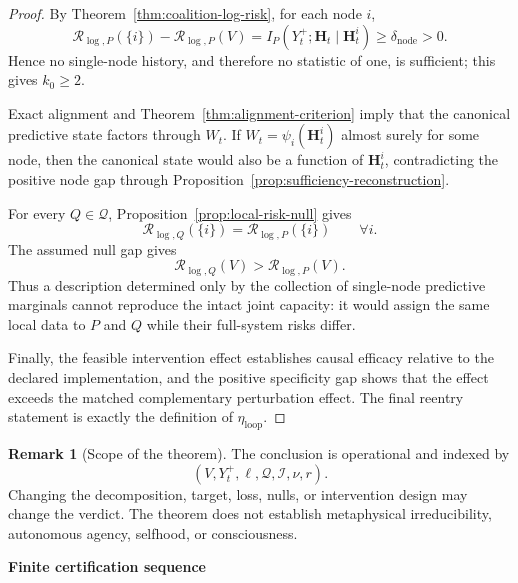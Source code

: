 \documentclass[11pt,letterpaper]{article}
\newcommand{\Risk}{\mathcal R}
\newcommand{\subtopic}[1]{%
 \vspace{0.45em}
 {\bfseries\color{AccentColor} #1\par}
}
\theoremstyle{plain}
\theoremstyle{definition}
\newtheorem{remark}[theorem]{Remark}
\begin{document}
\begin{proof}
By Theorem~\ref{thm:coalition-log-risk}, for each node \(i\),
\[
\Risk_{\log,P}(\{i\})-
\Risk_{\log,P}(V)
=
I_P(Y_t^+;\mathbf H_t\mid\mathbf H_t^i)
\geq
\delta_{\mathrm{node}}>0.
\]
Hence no single-node history, and therefore no statistic of one, is sufficient;
this gives \(k_0\geq2\).

Exact alignment and Theorem~\ref{thm:alignment-criterion} imply that the
canonical predictive state factors through \(W_t\). If
\(W_t=\psi_i(\mathbf H_t^i)\) almost surely for some node, then the canonical
state would also be a function of \(\mathbf H_t^i\), contradicting the positive
node gap through Proposition~\ref{prop:sufficiency-reconstruction}.

For every \(Q\in\mathcal Q\), Proposition~\ref{prop:local-risk-null} gives
\[
\Risk_{\log,Q}(\{i\})
=
\Risk_{\log,P}(\{i\})
\qquad\forall i.
\]
The assumed null gap gives
\[
\Risk_{\log,Q}(V)
>
\Risk_{\log,P}(V).
\]
Thus a description determined only by the collection of single-node predictive
marginals cannot reproduce the intact joint capacity: it would assign the same
local data to \(P\) and \(Q\) while their full-system risks differ.

Finally, the feasible intervention effect establishes causal efficacy relative
to the declared implementation, and the positive specificity gap shows that
the effect exceeds the matched complementary perturbation effect. The final
reentry statement is exactly the definition of \(\eta_{\mathrm{loop}}\).
\end{proof}

\begin{remark}[Scope of the theorem]
The conclusion is operational and indexed by
\[
(V,Y_t^+,\ell,\mathcal Q,\mathcal I,\nu,r).
\]
Changing the decomposition, target, loss, nulls, or intervention design may
change the verdict. The theorem does not establish metaphysical
irreducibility, autonomous agency, selfhood, or consciousness.
\end{remark}

\subtopic{Finite certification sequence}
\end{document}

